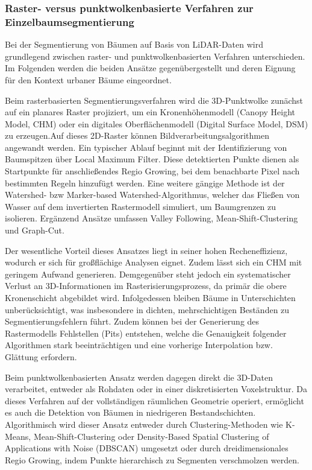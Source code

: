 \subsubsection{Raster- versus punktwolkenbasierte Verfahren zur Einzelbaumsegmentierung}

Bei der Segmentierung von Bäumen auf Basis von LiDAR-Daten wird grundlegend zwischen raster- und punktwolkenbasierten Verfahren unterschieden. Im Folgenden werden die beiden Ansätze gegenübergestellt und deren Eignung für den Kontext urbaner Bäume eingeordnet.

Beim rasterbasierten Segmentierungsverfahren wird die 3D-Punktwolke zunächst auf ein planares Raster projiziert, um ein Kronenhöhenmodell (Canopy Height Model, CHM) oder ein digitales Oberflächenmodell (Digital Surface Model, DSM) zu erzeugen.Auf dieses 2D-Raster können Bildverarbeitungsalgorithmen angewandt werden. Ein typischer Ablauf beginnt mit der Identifizierung von Baumspitzen über Local Maximum Filter. Diese detektierten Punkte dienen als Startpunkte für anschließendes Regio Growing, bei dem benachbarte Pixel nach bestimmten Regeln hinzufügt werden. Eine weitere gängige Methode ist der Watershed- bzw Marker-based Watershed-Algorithmus, welcher das Fließen von Wasser auf dem invertierten Rastermodell simuliert, um Baumgrenzen zu isolieren. Ergänzend Ansätze umfassen Valley Following, Mean-Shift-Clustering und Graph-Cut. \citep{fuIndividualTreeSegmentationUAV2024}

Der wesentliche Vorteil dieses Ansatzes liegt in seiner hohen Recheneffizienz, wodurch er sich für großflächige Analysen eignet.
Zudem lässt sich ein CHM mit geringem Aufwand generieren. Demgegenüber steht jedoch ein systematischer Verlust an 3D-Informationen im Rasterisierungsprozess, da primär die obere Kronenschicht abgebildet wird. Infolgedessen bleiben Bäume in Unterschichten unberücksichtigt, was insbesondere in dichten, mehrschichtigen Beständen zu Segmentierungsfehlern führt. \citep{munzingerMappingUrbanForest2022}Zudem können bei der Generierung des Rastermodells Fehlstellen (Pits) entstehen, welche die Genauigkeit folgender Algorithmen stark beeinträchtigen und eine vorherige Interpolation bzw. Glättung erfordern. \citep{liIndividualTreeSegmentation2023}


Beim punktwolkenbasierten Ansatz werden dagegen direkt die 3D-Daten verarbeitet, entweder als Rohdaten oder in einer diskretisierten Voxelstruktur. Da dieses Verfahren auf der vollständigen räumlichen Geometrie operiert, ermöglicht es auch die Detektion von Bäumen in niedrigeren Bestandschichten. \citep{munzingerMappingUrbanForest2022} Algorithmisch wird dieser Ansatz entweder durch Clustering-Methoden wie K-Means, Mean-Shift-Clustering oder Density-Based Spatial Clustering of Applications with Noise (DBSCAN) umgesetzt oder durch dreidimensionales Regio Growing, indem Punkte hierarchisch zu Segmenten verschmolzen werden. \citep{fuIndividualTreeSegmentationUAV2024}


